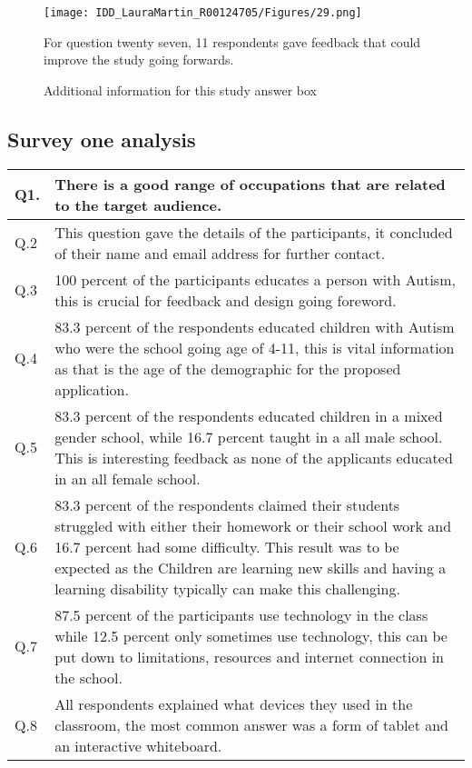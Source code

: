\begin{figure}[ht]
\centering
\texttt{[image: IDD\_LauraMartin\_R00124705/Figures/29.png]}
\caption{Additional information for this study answer box}
{For question twenty seven, 11 respondents gave feedback that could improve the study going forwards.}
\end{figure}



\subsection{Survey one analysis}

\begin{table} [b]
    \centering
\begin{tabular}{ | m{3em} | m{10cm}| } 
\hline
Q1. & There is a good range of occupations that are related to the target audience. \\ 
\hline
Q.2 & This question gave the details of the participants, it concluded of their name and email address for further contact. \\ 
\hline
Q.3 & 100 percent of the participants educates a person with Autism, this is crucial for feedback and design going foreword.  \\ 
\hline
Q.4 & 83.3 percent of the respondents educated children with Autism who were the school going age of 4-11, this is vital information as that is the age of the demographic for the proposed application.  \\ 
\hline
Q.5 & 83.3 percent of the respondents educated children in a mixed gender school, while 16.7 percent taught in a all male school. This is interesting feedback as none of the applicants educated in an all female school.  \\ 
\hline
Q.6 & 83.3 percent of the respondents claimed their students struggled with either their homework or their school work and 16.7 percent had some difficulty. This result was to be expected as the Children are learning new skills and having a learning disability typically can make this challenging.   \\ 
\hline
Q.7 & 87.5 percent of the participants use technology in the class while 12.5 percent only sometimes use technology, this can be put down to limitations, resources and internet connection in the school. \\ 
\hline
Q.8 & All respondents explained what devices they used in the classroom, the most common answer was a form of tablet and an interactive whiteboard. \\ 

\end{tabular}
\end{table}
